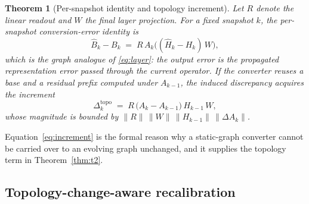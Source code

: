 \documentclass[preprint,12pt]{elsarticle}
\newtheorem{theorem}{Theorem}
\begin{document}
\begin{theorem}[Per-snapshot identity and topology increment]
\label{thm:t1}
Let $R$ denote the linear readout and $W$ the final layer projection. For a fixed snapshot $k$, the per-snapshot conversion-error identity is
\begin{equation}
\hat B_k-B_k \;=\; R\,A_k\big((\hat H_k-H_k)\,W\big),
\label{eq:identity}
\end{equation}
which is the graph analogue of \eqref{eq:layer}: the output error is the propagated representation error passed through the current operator. If the converter reuses a base and a residual prefix computed under $A_{k-1}$, the induced discrepancy acquires the increment
\begin{equation}
\Delta^{\text{topo}}_k \;=\; R\,\big(A_k-A_{k-1}\big)\,H_{k-1}\,W ,
\label{eq:increment}
\end{equation}
whose magnitude is bounded by $\|R\|\,\|W\|\,\|H_{k-1}\|\,\|\Delta A_k\|$.
\end{theorem}

Equation~\eqref{eq:increment} is the formal reason why a static-graph converter cannot be carried over to an evolving graph unchanged, and it supplies the topology term in Theorem~\ref{thm:t2}.

\subsection{Topology-change-aware recalibration}
\label{sec:tcar}
\end{document}

